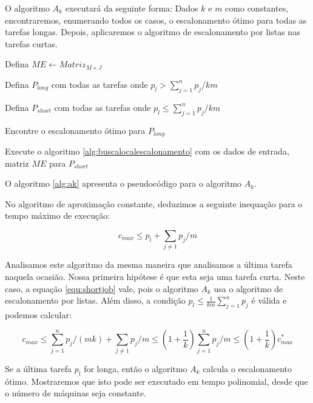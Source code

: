 O algoritmo $A_k$ executará da seguinte forma: Dados $k$ e $m$ como constantes, encontraremos, enumerando todos os casos, o escalonamento ótimo para todas as tarefas longas. Depois, aplicaremos o algoritmo de escalonamento por listas nas tarefas curtas.

\begin{algorithm}[H]
\SetAlgoLined
{}

Defina $ME \leftarrow Matriz_{M \times J}$

Defina $P_{long}$ com todas as tarefas onde $p_l > \sum_{j=1}^{n} p_j / km$

Defina $P_{short}$ com todas as tarefas onde $p_l \leq \sum_{j=1}^{n} p_j / km$

Encontre o escalonamento ótimo para $P_{long}$

Execute o algoritmo \ref{alg:buscalocalescalonamento} com os dados de entrada, matriz $ME$ para $P_{short}$

\caption{$A_k$}
\label{alg:ak}
\end{algorithm}

O algoritmo \ref{alg:ak} apresenta o pseudocódigo para o algoritmo $A_k$.

No algoritmo de aproximação constante, deduzimos a seguinte inequação para o tempo máximo de execução:

\begin{equation}
\label{equ:shortjob}
c_{max} \leq p_l + \sum_{j \neq 1} p_j / m
\end{equation}

Analisamos este algoritmo da mesma maneira que analisamos a última tarefa naquela ocasião. Nossa primeira hipótese é que esta seja uma tarefa curta. Neste caso, a equação \ref{equ:shortjob} vale, pois o algoritmo $A_k$ usa o algoritmo de escalonamento por listas. Além disso, a condição $p_l \leq \frac{1}{km} \sum_{j=1}^{n} p_j$ é válida e podemos calcular: 

\begin{equation}
c_{max} \leq \sum_{j = 1}^{n} p_j / (mk) + \sum_{j \neq 1} p_j / m \leq \left(1 + \frac{1}{k}\right) \sum_{j=1}^{n} p_j/m \leq \left(1 + \frac{1}{k}\right) c_{max}^*
\end{equation}

Se a última tarefa $p_l$ for longa, então o algoritmo $A_k$ calcula o escalonamento ótimo. Mostraremos que isto pode ser executado em tempo polinomial, desde que o número de máquinas seja constante.

